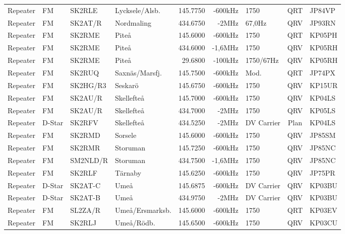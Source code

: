 \begin{longtable}{llllrrlcl}
Repeater & FM     & SK2RLE    & Lycksele/Alsb.     & 145.7750 & -600kHz & 1750             & QRT  & JP84VP \\
Repeater & FM     & SK2AT/R   & Nordmaling         & 434.6750 & -2MHz   & 67,0Hz           & QRV  & JP93RN \\
Repeater & FM     & SK2RME    & Piteå              & 145.6000 & -600kHz & 1750             & QRT  & KP05PH \\
Repeater & FM     & SK2RME    & Piteå              & 434.6000 & -1,6MHz & 1750             & QRV  & KP05RH \\
Repeater & FM     & SK2RME    & Piteå              & 29.6800  & -100kHz & 1750/67Hz        & QRV  & KP05RH \\
Repeater & FM     & SK2RUQ    & Saxnäs/Marsfj.     & 145.7500 & -600kHz & Mod.             & QRT  & JP74PX \\
Repeater & FM     & SK2HG/R3  & Seskarö            & 145.6750 & -600kHz & 1750             & QRV  & KP15UR \\
Repeater & FM     & SK2AU/R   & Skellefteå         & 145.7000 & -600kHz & 1750             & QRV  & KP04LS \\
Repeater & FM     & SK2AU/R   & Skellefteå         & 434.7000 & -2MHz   & 1750             & QRV  & KP05LS \\
Repeater & D-Star & SK2RFV    & Skellefteå         & 434.5250 & -2MHz   & DV Carrier       & Plan & KP04LS \\
Repeater & FM     & SK2RMD    & Sorsele            & 145.6000 & -600kHz & 1750             & QRV  & JP85SM \\
Repeater & FM     & SK2RMR    & Storuman           & 145.7250 & -600kHz & 1750             & QRV  & JP85NC \\
Repeater & FM     & SM2NLD/R  & Storuman           & 434.7500 & -1,6MHz & 1750             & QRV  & JP85NC \\
Repeater & FM     & SK2RLF    & Tärnaby            & 145.6250 & -600kHz & 1750             & QRV  & JP75PR \\
Repeater & D-Star & SK2AT-C   & Umeå               & 145.6875 & -600kHz & DV Carrier       & QRV  & KP03BU \\
Repeater & D-Star & SK2AT-B   & Umeå               & 434.9750 & -2MHz   & DV Carrier       & QRV  & KP03BU \\
Repeater & FM     & SL2ZA/R   & Umeå/Ersmarksb.    & 145.6000 & -600kHz & 1750             & QRT  & KP03EV \\
Repeater & FM     & SK2RLJ    & Umeå/Rödb.         & 145.6500 & -600kHz & 1750             & QRV  & KP03CU \\

\end{longtable}
